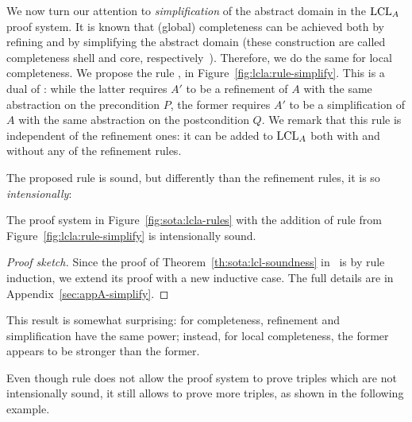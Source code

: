 We now turn our attention to \emph{simplification} of the abstract domain in the $\text{LCL}_A$ proof system. It is known that (global) completeness can be achieved both by refining and by simplifying the abstract domain (these construction are called completeness shell and core, respectively~\cite{GRS00}). Therefore, we do the same for local completeness.
We propose the rule , in Figure~\ref{fig:lcla:rule-simplify}. This is a dual of : while the latter requires $A'$ to be a refinement of $A$ with the same abstraction on the precondition $P$, the former requires $A'$ to be a simplification of $A$ with the same abstraction on the postcondition $Q$. We remark that this rule is independent of the refinement ones: it can be added to $\text{LCL}_A$ both with and without any of the refinement rules.

The proposed rule  is sound, but differently than the refinement rules, it is so \emph{intensionally}:

\begin{theorem}\label{th:lcla:soundness-rule-simpl}
	The proof system in Figure~\ref{fig:sota:lcla-rules} with the addition of rule  from Figure~\ref{fig:lcla:rule-simplify} is intensionally sound.
\end{theorem}
\begin{proof}[Proof sketch]
	Since the proof of Theorem~\ref{th:sota:lcl-soundness} in~\cite{BGGR21} is by rule induction, we extend its proof with a new inductive case. The full details are in Appendix~\ref{sec:appA-simplify}.
\end{proof}

This result is somewhat surprising: for completeness, refinement and simplification have the same power; instead, for local completeness, the former appears to be stronger than the former.

Even though rule  does not allow the proof system to prove triples which are not intensionally sound, it still allows to prove more triples, as shown in the following example.

